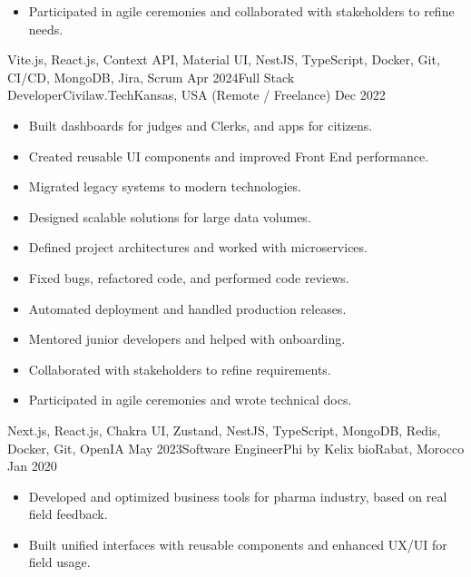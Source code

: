 \begin{experiences}
{\begin{itemize}
                \item Participated in agile ceremonies and collaborated with stakeholders to refine needs.\\
            \end{itemize}}
            {Vite.js, React.js, Context API, Material UI, NestJS, TypeScript, Docker, Git, CI/CD, MongoDB, Jira, Scrum}
    \emptySeparator
    \experience
        {Apr 2024}{Full Stack Developer}{Civilaw.Tech}{Kansas, USA (Remote / Freelance)}
        {Dec 2022}
            {\begin{itemize}
                \item Built dashboards for judges and Clerks, and apps for citizens.
                \item Created reusable UI components and improved Front End performance.
                \item Migrated legacy systems to modern technologies.
                \item Designed scalable solutions for large data volumes.
                \item Defined project architectures and worked with microservices.
                \item Fixed bugs, refactored code, and performed code reviews.
                \item Automated deployment and handled production releases.
                \item Mentored junior developers and helped with onboarding.
                \item Collaborated with stakeholders to refine requirements.
                \item Participated in agile ceremonies and wrote technical docs.\\
            \end{itemize}}
            {Next.js, React.js, Chakra UI, Zustand, NestJS, TypeScript, MongoDB, Redis, Docker, Git, OpenIA}
    \emptySeparator
    \experience
        {May 2023}{Software Engineer}{Phi by Kelix bio}{Rabat, Morocco}
        {Jan 2020}
            {\begin{itemize}
                \item Developed and optimized business tools for pharma industry, based on real field feedback.
                \item Built unified interfaces with reusable components and enhanced UX/UI for field usage.

\end{itemize}}
\end{experiences}
